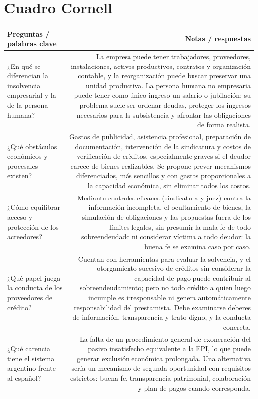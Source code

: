 \documentclass[12pt,oneside]{book}
\begin{document}
\section*{Cuadro Cornell}
\begin{longtable}{QR}
\toprule
Preguntas / palabras clave & \textbf{Notas / respuestas} \\
\midrule
\endhead
¿En qué se diferencian la insolvencia empresarial y la de la persona humana? &
La empresa puede tener trabajadores, proveedores, instalaciones, activos productivos, contratos y organización contable, y la reorganización puede buscar preservar una unidad productiva. La persona humana no empresaria puede tener como único ingreso un salario o jubilación; su problema suele ser ordenar deudas, proteger los ingresos necesarios para la subsistencia y afrontar las obligaciones de forma realista. \\[0.8em]
¿Qué obstáculos económicos y procesales existen? &
Gastos de publicidad, asistencia profesional, preparación de documentación, intervención de la sindicatura y costos de verificación de créditos, especialmente graves si el deudor carece de bienes realizables. Se propone prever mecanismos diferenciados, más sencillos y con gastos proporcionales a la capacidad económica, sin eliminar todos los costos. \\[0.8em]
¿Cómo equilibrar acceso y protección de los acreedores? &
Mediante controles eficaces (sindicatura y juez) contra la información incompleta, el ocultamiento de bienes, la simulación de obligaciones y las propuestas fuera de los límites legales, sin presumir la mala fe de todo sobreendeudado ni considerar víctima a todo deudor: la buena fe se examina caso por caso. \\[0.8em]
¿Qué papel juega la conducta de los proveedores de crédito? &
Cuentan con herramientas para evaluar la solvencia, y el otorgamiento sucesivo de créditos sin considerar la capacidad de pago puede contribuir al sobreendeudamiento; pero no todo crédito a quien luego incumple es irresponsable ni genera automáticamente responsabilidad del prestamista. Debe examinarse deberes de información, transparencia y trato digno, y la conducta concreta. \\[0.8em]
¿Qué carencia tiene el sistema argentino frente al español? &
La falta de un procedimiento general de exoneración del pasivo insatisfecho equivalente a la EPI, lo que puede generar exclusión económica prolongada. Una alternativa sería un mecanismo de segunda oportunidad con requisitos estrictos: buena fe, transparencia patrimonial, colaboración y plan de pagos cuando corresponda. \\[0.8em]

\end{longtable}
\end{document}
